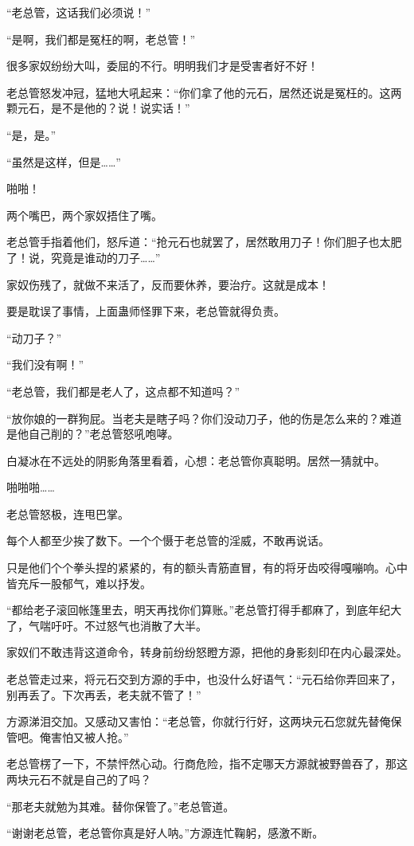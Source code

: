 \begin{this_body}
“老总管，这话我们必须说！”

“是啊，我们都是冤枉的啊，老总管！”

很多家奴纷纷大叫，委屈的不行。明明我们才是受害者好不好！

老总管怒发冲冠，猛地大吼起来：“你们拿了他的元石，居然还说是冤枉的。这两颗元石，是不是他的？说！说实话！”

“是，是。”

“虽然是这样，但是……”

啪啪！

两个嘴巴，两个家奴捂住了嘴。

老总管手指着他们，怒斥道：“抢元石也就罢了，居然敢用刀子！你们胆子也太肥了！说，究竟是谁动的刀子……”

家奴伤残了，就做不来活了，反而要休养，要治疗。这就是成本！

要是耽误了事情，上面蛊师怪罪下来，老总管就得负责。

“动刀子？”

“我们没有啊！”

“老总管，我们都是老人了，这点都不知道吗？”

“放你娘的一群狗屁。当老夫是瞎子吗？你们没动刀子，他的伤是怎么来的？难道是他自己削的？”老总管怒吼咆哮。

白凝冰在不远处的阴影角落里看着，心想：老总管你真聪明。居然一猜就中。

啪啪啪……

老总管怒极，连甩巴掌。

每个人都至少挨了数下。一个个慑于老总管的淫威，不敢再说话。

只是他们个个拳头捏的紧紧的，有的额头青筋直冒，有的将牙齿咬得嘎嘣响。心中皆充斥一股郁气，难以抒发。

“都给老子滚回帐篷里去，明天再找你们算账。”老总管打得手都麻了，到底年纪大了，气喘吁吁。不过怒气也消散了大半。

家奴们不敢违背这道命令，转身前纷纷怒瞪方源，把他的身影刻印在内心最深处。

老总管走过来，将元石交到方源的手中，也没什么好语气：“元石给你弄回来了，别再丢了。下次再丢，老夫就不管了！”

方源涕泪交加。又感动又害怕：“老总管，你就行行好，这两块元石您就先替俺保管吧。俺害怕又被人抢。”

老总管楞了一下，不禁怦然心动。行商危险，指不定哪天方源就被野兽吞了，那这两块元石不就是自己的了吗？

“那老夫就勉为其难。替你保管了。”老总管道。

“谢谢老总管，老总管你真是好人呐。”方源连忙鞠躬，感激不断。


\end{this_body}
